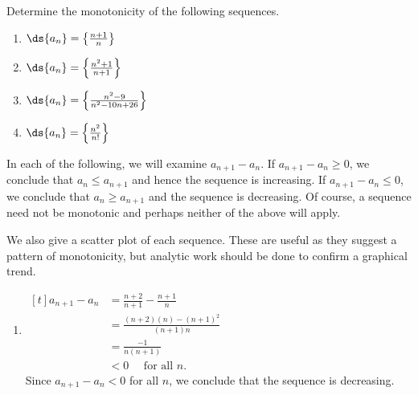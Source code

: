 
\begin{example}\label{ex_seq7}
Determine the monotonicity of the following sequences.
\begin{multicols}{2}
\begin{enumerate}
\item $\ds \{a_n\} = \left\{\frac{n+1}n\right\}$
\item	$\ds \{a_n\} = \left\{\frac{n^2+1}{n+1}\right\}$	
\item $\ds \{a_n\} = \left\{\frac{n^2-9}{n^2-10n+26}\right\}$
\item	$\ds \{a_n\} = \left\{\frac{n^2}{n!}\right\}$	
\end{enumerate}
\end{multicols}
\solution
In each of the following, we will examine $a_{n+1}-a_n$. If $a_{n+1}-a_n \ge0$, we conclude that $a_n\le a_{n+1}$ and hence the sequence is increasing. If $a_{n+1}-a_n\le0$, we conclude that $a_n\ge a_{n+1}$ and the sequence is decreasing. Of course, a sequence need not be monotonic and perhaps neither of the above will apply.

We also give a scatter plot of each sequence. These are useful as they suggest a pattern of monotonicity, but analytic work should be done to confirm a graphical trend.

\begin{enumerate}
\item \hfill$\begin{aligned}[t]
a_{n+1}-a_n &= \frac{n+2}{n+1} - \frac{n+1}{n} \\		
	&= \frac{(n+2)(n)-(n+1)^2}{(n+1)n} \\
	&=	\frac{-1}{n(n+1)} \\
	&<0 \quad\text{ for all $n$.}
\end{aligned}$\hfill\null\\
%
%
Since $a_{n+1}-a_n<0$ for all $n$, we conclude that the sequence is decreasing.


\end{enumerate}
\end{example}
